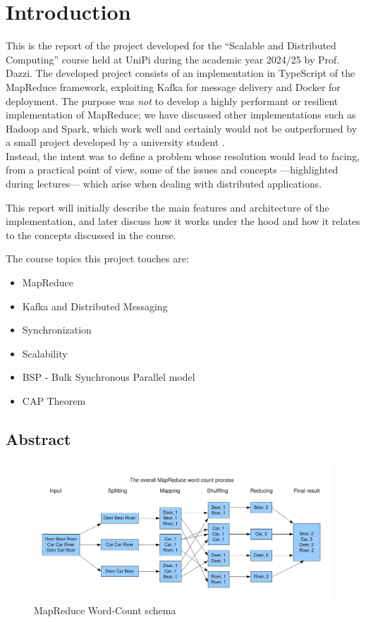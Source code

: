 \chapter{Introduction}
\lstset{language=javascript}

This is the report of the project developed for the ``Scalable and Distributed Computing'' course held at UniPi during the academic year 2024/25 by Prof. Dazzi.
The developed project consists of an implementation in TypeScript of the MapReduce framework, exploiting Kafka for message delivery and Docker for deployment.
The purpose was \textit{not} to develop a highly performant or resilient implementation of MapReduce; we have discussed other implementations such as Hadoop and Spark, which work well and certainly would not be outperformed by a small project developed by a university student \smiley. \\
Instead, the intent was to define a problem whose resolution would lead to facing, from a practical point of view, some of the issues and concepts ---highlighted during lectures--- which arise when dealing with distributed applications.

This report will initially describe the main features and architecture of the implementation, and later discuss how it works under the hood and how it relates to the concepts discussed in the course.

\nl

{The course topics this project touches are:\ns
\begin{itemize}
   \item MapReduce
   \item Kafka and Distributed Messaging
   \item Synchronization
   \item Scalability
   \item BSP - Bulk Synchronous Parallel model
   \item CAP Theorem
\end{itemize}}
\newpage

\section{Abstract}
\begin{figure}[htbp]
   \centering
   \includegraphics[width=\columnwidth]{images/mapreduce.png}
   \caption{MapReduce Word-Count schema}
   \label{fig:mapreduce}
\end{figure}

